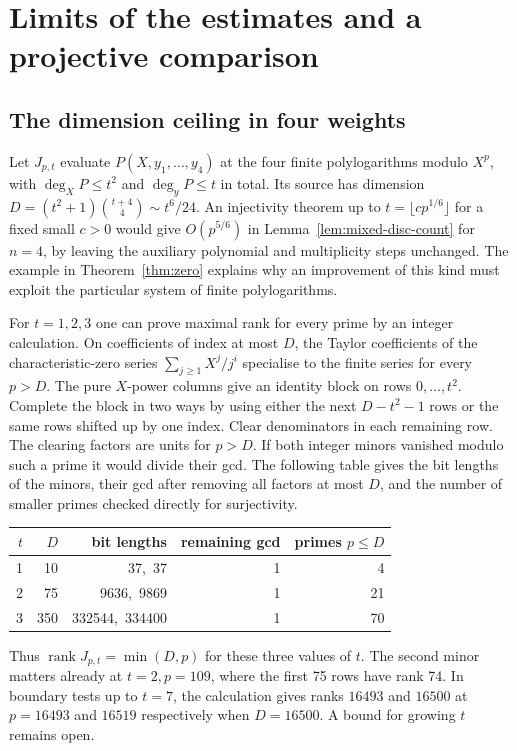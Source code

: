 \section{Limits of the estimates and a projective comparison}\label{sec:discussion}
\subsection{The dimension ceiling in four weights}
Let \(J_{p,t}\) evaluate \(P(X,y_1,\ldots,y_4)\) at the four finite
polylogarithms modulo \(X^p\), with \(\deg_X P\le t^2\) and
\(\deg_y P\le t\) in total. Its source has dimension
\(D=(t^2+1)\binom{t+4}{4}\sim t^6/24\). An injectivity theorem up
to \(t=\lfloor cp^{1/6}\rfloor\) for a fixed small \(c>0\) would give
\(O(p^{5/6})\) in Lemma~\ref{lem:mixed-disc-count} for \(n=4\), by
leaving the auxiliary polynomial and multiplicity steps unchanged.
The example in Theorem~\ref{thm:zero} explains why an improvement of this
kind must exploit the particular system of finite polylogarithms.

For \(t=1,2,3\) one can prove maximal rank for every prime by an integer
calculation. On coefficients of index at most \(D\), the Taylor coefficients
of the characteristic-zero series \(\sum_{j\ge1}X^j/j^i\) specialise
to the finite series for every \(p>D\). The pure \(X\)-power columns give
an identity block on rows \(0,\ldots,t^2\). Complete the block in two ways
by using either the next \(D-t^2-1\) rows or the same rows shifted up
by one index. Clear denominators in each remaining row. The clearing
factors are units for \(p>D\). If both integer minors vanished modulo such a
prime it would divide their gcd. The following table gives the bit lengths
of the minors, their gcd after removing all factors at most \(D\), and
the number of smaller primes checked directly for surjectivity.
\begin{center}
\begin{tabular}{rrrrr}
\toprule
\(t\)&\(D\)&bit lengths&remaining gcd&primes \(p\le D\)\\
\midrule
1&10&37,\ 37&1&4\\
2&75&9636,\ 9869&1&21\\
3&350&332544,\ 334400&1&70\\
\bottomrule
\end{tabular}
\end{center}
Thus \(\operatorname{rank}J_{p,t}=\min(D,p)\) for these three values of \(t\).
The second minor matters already at \(t=2,p=109\), where the first 75
rows have rank 74. In boundary tests up to \(t=7\), the calculation gives
ranks \(16493\) and \(16500\) at \(p=16493\) and \(16519\) respectively
when \(D=16500\). A bound for growing \(t\) remains open.

